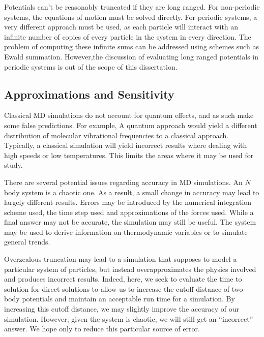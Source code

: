 %
Potentials can't be reasonably truncated if they are long ranged.
%
For non-periodic systems, the equations of motion must be solved directly.
%
For periodic systems, a very different approach must be used, as each particle
will interact with an infinite number of copies of every particle in the
system in every direction.
%
The problem of computing these infinite sums can be addressed using
schemes such as Ewald summation.
%
However,the discussion of evaluating long ranged potentials in periodic systems
is out of the scope of this dissertation.


\subsection{Approximations and Sensitivity}

Classical MD simulations do not account for quantum effects,
and as such make some false predictions.
%
For example, A quantum approach would yield
a different distribution of
molecular vibrational frequencies to a classical approach.
%
Typically, a classical simulation will yield incorrect results
where dealing with high speeds or low temperatures.
%
This limits the areas where it may be used for study.

There are several potential issues regarding accuracy in MD simulations.
%
An $N$ body system is a chaotic one.
%
As a result, a small change in accuracy may lead to
largely different results.
%
Errors may be introduced by
the numerical integration scheme used,
the time step used and
approximations of the forces used.
%
While a final answer may not be accurate,
the simulation may still be useful.
%
The system may be used to derive information on
thermodynamic variables or to simulate general trends.

Overzealous truncation may lead to a simulation that supposes to
model a particular system of particles, but instead overapproximates
the physics involved and produces incorrect results.
%
Indeed, here, we seek to evaluate the time to solution for direct solutions
to allow us to increase the cutoff distance of two-body potentials
and maintain an acceptable run time for a simulation.
%
By increasing this cutoff distance, we may slightly improve the accuracy
of our simulation.
%
However, given the system is chaotic, we will
still get an ``incorrect'' answer.
%
We hope only to reduce this particular source of error.
